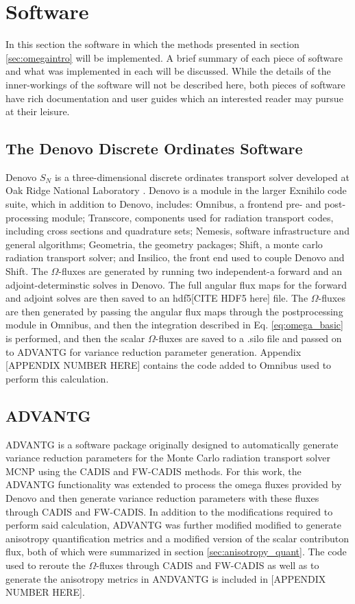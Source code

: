 \section{Software}
\label{sec:software}

In this section the software in which the methods presented in section
\ref{sec:omegaintro} will be implemented. A brief summary of each piece of
software and what was implemented in each will be discussed.
While the details of the inner-workings of the software will not be described
here, both pieces of software have rich documentation and user guides which an
interested reader may pursue at their leisure.

\subsection{The Denovo Discrete Ordinates Software}

Denovo $S_N$ is a three-dimensional discrete ordinates transport solver
developed at Oak Ridge National Laboratory \cite{evans_denovo:_2010}. Denovo is a module in the larger
Exnihilo code suite, which in addition to Denovo,
includes: Omnibus, a frontend pre- and post-processing module; Transcore,
components used for radiation transport codes, including cross sections and
quadrature sets; Nemesis, software infrastructure and general algorithms;
Geometria, the geometry packages; Shift, a monte carlo radiation transport
solver; and Insilico, the front end used to couple Denovo and Shift. The
$\Omega$-fluxes are generated by running two independent-a forward and an
adjoint-determinstic solves in Denovo. The full angular flux maps for the
forward and adjoint solves are then saved to an hdf5[CITE HDF5 here] file. The
$\Omega$-fluxes are then generated by passing the angular flux maps through the
postprocessing module in Omnibus, and then the integration described in Eq.
\ref{eq:omega_basic} is performed, and then the scalar $\Omega$-fluxes are saved
to a .silo file and passed on to ADVANTG for variance reduction parameter
generation. Appendix [APPENDIX NUMBER HERE] contains the code added to Omnibus
used to perform this calculation.

\subsection{ADVANTG}

ADVANTG \cite{mosher_new_2010} is a software package
originally designed to automatically
generate variance reduction
parameters for the Monte Carlo radiation transport solver
MCNP \cite{brown_mcnp_2002}
using the CADIS
and FW-CADIS methods. For this work, the ADVANTG functionality was extended to
process the omega fluxes provided by Denovo and then generate variance reduction
parameters with these fluxes through CADIS and FW-CADIS. In addition to the
modifications required to perform said calculation, ADVANTG was further modified
modified to generate anisotropy quantification metrics and a modified version of
the scalar contributon flux, both of which were summarized in
section \ref{sec:anisotropy_quant}. The code used to reroute the $\Omega$-fluxes
through CADIS and FW-CADIS as well as to generate the anisotropy metrics in
ANDVANTG is included in [APPENDIX NUMBER HERE].
